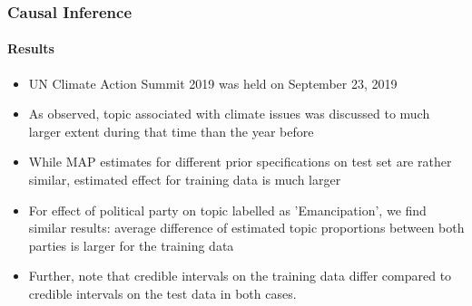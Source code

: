 \documentclass[xcolor=dvipsnames]{beamer}
\begin{document}
\begin{frame}
\frametitle{Causal Inference}
\framesubtitle{Results}
\begin{itemize}
\item UN Climate Action Summit 2019 was held on September 23, 2019
\item As observed, topic associated with climate issues was discussed to much larger extent during that time than the year before
\item While MAP estimates for different prior specifications on test set are rather similar, estimated effect for training data is much larger
\item For effect of political party on topic labelled as 'Emancipation', we find similar results: average difference of estimated topic proportions between both parties is larger for the training data
\item Further, note that credible intervals on the training data differ compared to credible intervals on the test data in both cases.
\end{itemize}
\end{frame}
\end{document}
